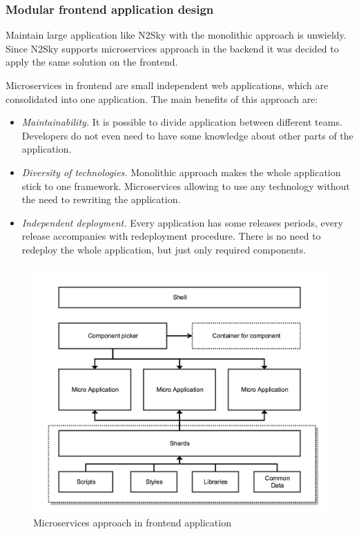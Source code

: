  
 
\subsubsection{Modular frontend application design}\label{Modular frontend application design}

Maintain large application like N2Sky with the monolithic approach is unwieldy. Since N2Sky supports microservices approach in the backend it was decided to apply the same solution on the frontend.  

Microservices in frontend are small independent web applications, which are consolidated into one application. The main benefits of this approach are:

\begin{itemize}
\item \emph{Maintainability.} It is possible to divide application between different teams. Developers do not even need to have some knowledge about other parts of the application. 
\item \emph{Diversity of technologies.} Monolithic approach makes the whole application stick to one framework. Microservices allowing to use any technology without the need to rewriting the application.
\item \emph{Independent deployment.} Every application has some releases periods, every release accompanies with redeployment procedure. There is no need to redeploy the whole application, but just only required components.
\end{itemize}


\begin{figure}[H]
\begin{center}
  \includegraphics[width=\linewidth]{components/2/frontend_arch.png}
  \caption{Microservices approach in frontend application}
  \label{fig:frontend_arch}
\end{center}
\end{figure}


